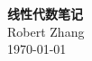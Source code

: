 \begin{titlepage}
  \thispagestyle{empty}
  \centering
  \vspace*{5cm}
  \Huge\textbf{线性代数笔记} \\
  \vspace{1.5cm}
  \Large Robert Zhang \\
  \vfill
  \large \today
\end{titlepage}
\newpage
